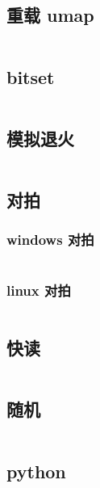 \documentclass[a4paper, twoside]{article}
\begin{document}
\begin{multicols}{2}
			\subsection{重载 umap}
				\inputminted{cpp}{../src-midori/other/重载umap.cpp}
			\subsection{bitset}
				\inputminted{cpp}{../src-midori/other/bitset.cpp}
			\subsection{模拟退火}
				\inputminted{cpp}{../src-midori/other/模拟退火.cpp}
			\subsection{对拍}
				\subsubsection{windows 对拍}
					\inputminted{bat}{../src-midori/other/duipai.bat}
				\subsubsection{linux 对拍}
					\inputminted{shell}{../src-midori/other/duipai.sh}
			\subsection{快读}
				\inputminted{cpp}{../src-midori/other/fread.cpp}
			\subsection{随机}
				\inputminted{cpp}{../src-midori/other/rand.cpp}
			\subsection{python}
				\inputminted{python}{../src-midori/python/sort.py}
		
	\end{multicols}
\end{document}
